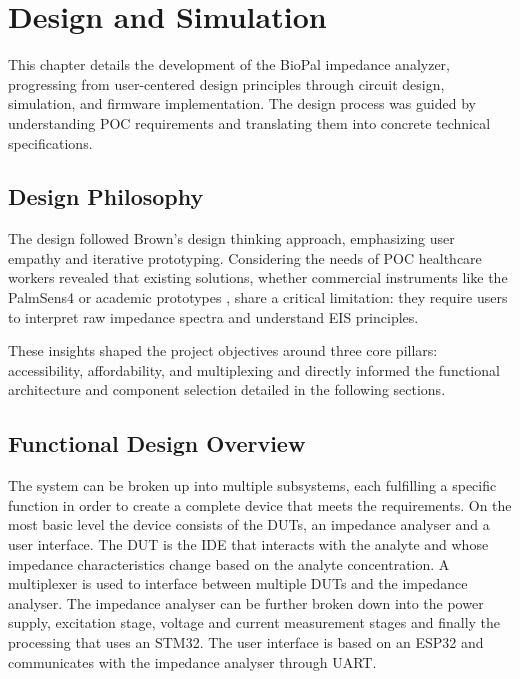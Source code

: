 \graphicspath{{design/fig/}}

\chapter{Design and Simulation}\label{chap:design}
This chapter details the development of the BioPal impedance analyzer, progressing from user-centered design principles through circuit design, simulation, and firmware implementation. The design process was guided by understanding POC requirements and translating them into concrete technical specifications.

\section{Design Philosophy}

The design followed Brown's design thinking approach\cite{brownDesignThinking2008}, emphasizing user empathy and iterative prototyping. Considering the needs of \ac{POC} healthcare workers revealed that existing solutions, whether commercial instruments like the PalmSens4 or academic prototypes \cite{buscagliaSimpleZLowCostPortable2023}\cite{ al-aliDesignPortableLowCost2017}, share a critical limitation: they require users to interpret raw impedance spectra and understand EIS principles.

These insights shaped the project objectives around three core pillars: accessibility, affordability, and multiplexing and directly informed the functional architecture and component selection detailed in the following sections.

\section{Functional Design Overview}
The system can be broken up into multiple subsystems, each fulfilling a specific function in order to create a complete device that meets the requirements. On the most basic level the device consists of the \acp{DUT}, an impedance analyser and a user interface. The DUT is the \ac{IDE} that interacts with the analyte and whose impedance characteristics change based on the analyte concentration. A multiplexer is used to interface between multiple \acp{DUT} and the impedance analyser. The impedance analyser can be further broken down into the power supply, excitation stage, voltage and current measurement stages and finally the processing that uses an STM32. The user interface is based on an ESP32 and communicates with the impedance analyser through UART.

